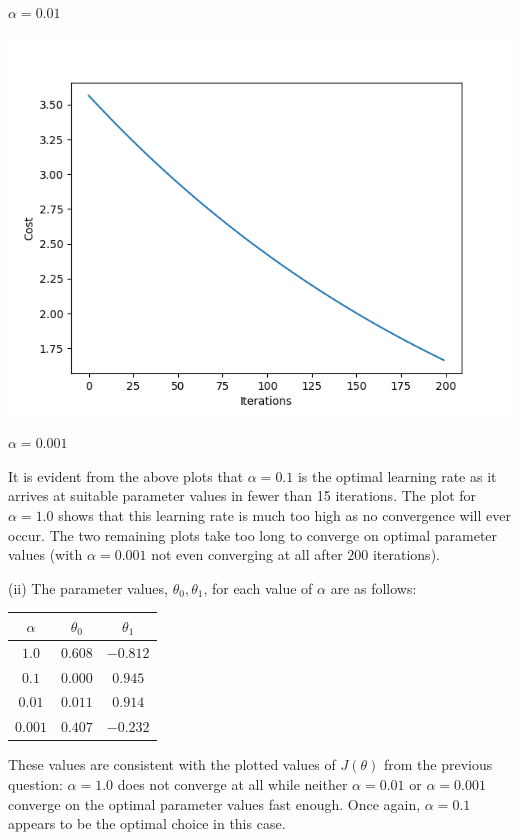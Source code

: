 \documentclass[12pt]{article}
\begin{document}
\begin{center}
    $\alpha = 0.01$
    
    \includegraphics[scale=0.55]{fig_4.png}
    
    $\alpha = 0.001$
    
\end{center}

It is evident from the above plots that $\alpha = 0.1$ is the optimal learning rate as it arrives at suitable parameter values in fewer than 15 iterations. The plot for $\alpha = 1.0$ shows that this learning rate is much too high as no convergence will ever occur. The two remaining plots take too long to converge on optimal parameter values (with $\alpha = 0.001$ not even converging at all after $200$ iterations).

\noindent (ii) The parameter values, $\theta_0, \theta_1$, for each value of $\alpha$ are as follows:

\begin{center}
    \begin{tabular}{|c|c|c|}
        \hline
        $\alpha$ & $\theta_0$ & $\theta_1$ \\
        \hline
        $1.0$ & $0.608$ & $-0.812$ \\
        $0.1$ & $0.000$ & $0.945$ \\
        $0.01$ & $0.011$ & $0.914$ \\
        $0.001$ & $0.407$ & $-0.232$ \\
        \hline
    \end{tabular}
\end{center}

These values are consistent with the plotted values of $J(\theta)$ from the previous question: $\alpha = 1.0$ does not converge at all while neither $\alpha = 0.01$ or $\alpha = 0.001$ converge on the optimal parameter values fast enough. Once again, $\alpha = 0.1$ appears to be the optimal choice in this case.
\end{document}
